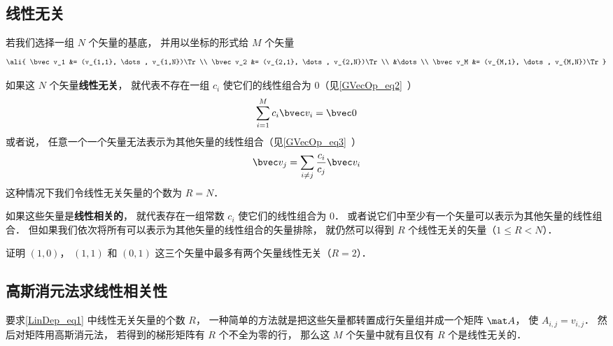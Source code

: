 

\subsection{线性无关}

若我们选择一组 $N$ 个矢量的基底， 并用以坐标的形式给 $M$ 个矢量
\begin{equation}\label{LinDep_eq1}
\ali{
\bvec v_1 &= (v_{1,1}, \dots, v_{1,N})\Tr \\
\bvec v_2 &= (v_{2,1}, \dots, v_{2,N})\Tr \\
&\dots \\
\bvec v_M &= (v_{M,1}, \dots, v_{M,N})\Tr
}\end{equation}

如果这 $N$ 个矢量\textbf{线性无关}， 就代表不存在一组 $c_i$ 使它们的线性组合为 0（见\autoref{GVecOp_eq2}~）
\begin{equation}
\sum_{i=1}^M c_i\bvec v_i = \bvec 0
\end{equation}
或者说， 任意一个一个矢量无法表示为其他矢量的线性组合（见\autoref{GVecOp_eq3}~）%
\begin{equation}
\bvec v_j = \sum_{i \ne j}\frac{c_i}{c_j} \bvec v_i
\end{equation}
这种情况下我们令线性无关矢量的个数为 $R = N$．

如果这些矢量是\textbf{线性相关的}， 就代表存在一组常数 $c_i$ 使它们的线性组合为 0． 或者说它们中至少有一个矢量可以表示为其他矢量的线性组合． 但如果我们依次将所有可以表示为其他矢量的线性组合的矢量排除， 就仍然可以得到  $R$ 个线性无关的矢量（$1 \leqslant R < N$）．

\begin{exercise}{}
证明 $(1,0)$， $(1,1)$ 和 $(0,1)$ 这三个矢量中最多有两个矢量线性无关（$R = 2$）．
\end{exercise}

\subsection{高斯消元法求线性相关性}
要求\autoref{LinDep_eq1} 中线性无关矢量的个数 $R$， 一种简单的方法就是把这些矢量都转置成行矢量组并成一个矩阵 $\mat A$， 使 $A_{i,j} = v_{i,j}$． 然后对矩阵用高斯消元法， 若得到的梯形矩阵有 $R$ 个不全为零的行， 那么这 $M$ 个矢量中就有且仅有 $R$ 个是线性无关的．





 